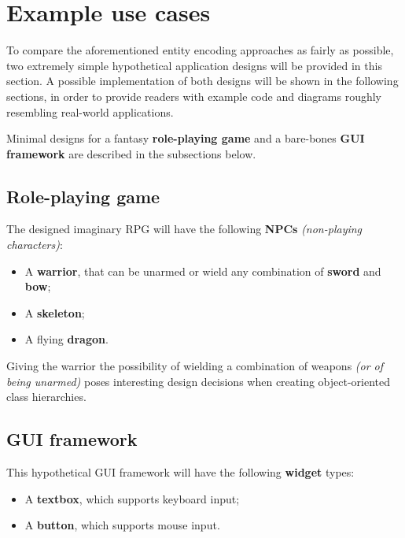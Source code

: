 \documentclass[oneside, 12pt, a4paper, openany]{book}
\begin{document}
\newpage

\section{Example use cases}\label{example-use-cases}

To compare the aforementioned entity encoding approaches as fairly as
possible, two extremely simple hypothetical application designs will be
provided in this section. A possible implementation of both designs will
be shown in the following sections, in order to provide readers with
example code and diagrams roughly resembling real-world applications.

Minimal designs for a fantasy \textbf{role-playing game} and a
bare-bones \textbf{GUI framework} are described in the subsections
below.

\subsection{Role-playing game}\label{role-playing-game}

The designed imaginary RPG will have the following \textbf{NPCs}
\emph{(non-playing characters)}:

\begin{itemize}
\item
  A \textbf{warrior}, that can be unarmed or wield any combination of
  \textbf{sword} and \textbf{bow};
\item
  A \textbf{skeleton};
\item
  A flying \textbf{dragon}.
\end{itemize}

Giving the warrior the possibility of wielding a combination of weapons
\emph{(or of being unarmed)} poses interesting design decisions when
creating object-oriented class hierarchies.

\subsection{GUI framework}\label{gui-framework}

This hypothetical GUI framework will have the following \textbf{widget}
types:

\begin{itemize}
\item
  A \textbf{textbox}, which supports keyboard input;
\item
  A \textbf{button}, which supports mouse input.
\end{itemize}
\end{document}

